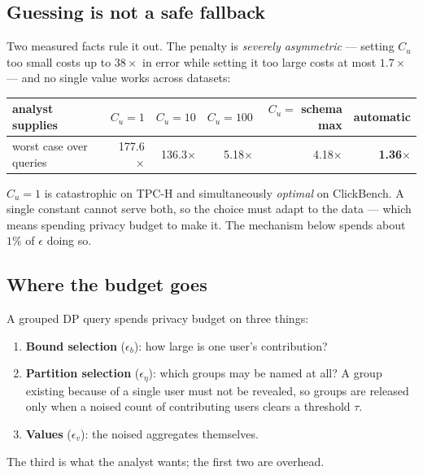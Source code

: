 \documentclass[11pt,a4paper]{article}
\newcommand{\Cu}{C_u}
\begin{document}
\subsection{Guessing is not a safe fallback}

Two measured facts rule it out. The penalty is \emph{severely asymmetric} --- setting $\Cu$ too
small costs up to $38\times$ in error while setting it too large costs at most $1.7\times$ --- and
no single value works across datasets:

\begin{center}\small
\begin{tabular}{lrrrrr}
\toprule
analyst supplies & $\Cu{=}1$ & $\Cu{=}10$ & $\Cu{=}100$ & $\Cu{=}$ schema max & automatic \\
\midrule
worst case over queries & 177.6$\times$ & 136.3$\times$ & 5.18$\times$ & 4.18$\times$ &
\textbf{1.36$\times$} \\
\bottomrule
\end{tabular}
\end{center}

$\Cu{=}1$ is catastrophic on TPC-H and simultaneously \emph{optimal} on ClickBench. A single
constant cannot serve both, so the choice must adapt to the data --- which means spending privacy
budget to make it. The mechanism below spends about $1\%$ of $\epsilon$ doing so.

\subsection{Where the budget goes}

A grouped DP query spends privacy budget on three things:

\begin{enumerate}
\item \textbf{Bound selection} ($\epsilon_b$): how large is one user's contribution?
\item \textbf{Partition selection} ($\epsilon_\eta$): which groups may be named at all? A group
existing because of a single user must not be revealed, so groups are released only when a noised
count of contributing users clears a threshold $\tau$.
\item \textbf{Values} ($\epsilon_v$): the noised aggregates themselves.
\end{enumerate}

The third is what the analyst wants; the first two are overhead.
\end{document}
